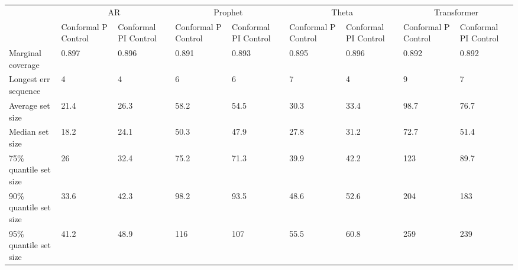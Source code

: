 \begin{tabular}{lllllllll}
\toprule
& \multicolumn{2}{c}{AR}& \multicolumn{2}{c}{Prophet}& \multicolumn{2}{c}{Theta}& \multicolumn{2}{c}{Transformer} \\
& Conformal P Control & Conformal PI Control & Conformal P Control & Conformal PI Control & Conformal P Control & Conformal PI Control & Conformal P Control & Conformal PI Control \\
\midrule
Marginal coverage & 0.897 & 0.896 & 0.891 & 0.893 & 0.895 & 0.896 & 0.892 & 0.892 \\
Longest err sequence & 4 & 4 & 6 & 6 & 7 & 4 & 9 & 7 \\
Average set size & 21.4 & 26.3 & 58.2 & 54.5 & 30.3 & 33.4 & 98.7 & 76.7 \\
Median set size & 18.2 & 24.1 & 50.3 & 47.9 & 27.8 & 31.2 & 72.7 & 51.4 \\
75\% quantile set size & 26 & 32.4 & 75.2 & 71.3 & 39.9 & 42.2 & 123 & 89.7 \\
90\% quantile set size & 33.6 & 42.3 & 98.2 & 93.5 & 48.6 & 52.6 & 204 & 183 \\
95\% quantile set size & 41.2 & 48.9 & 116 & 107 & 55.5 & 60.8 & 259 & 239 \\
\bottomrule
\end{tabular}

